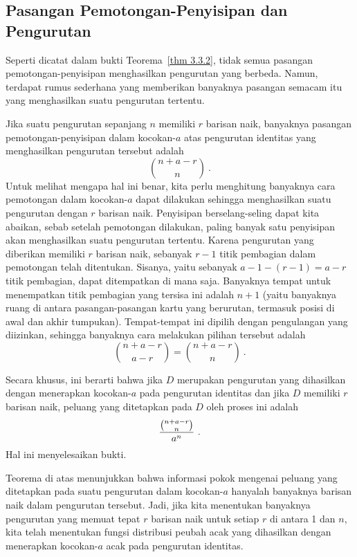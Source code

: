 \subsection*{Pasangan Pemotongan-Penyisipan dan Pengurutan}
Seperti dicatat dalam bukti Teorema~\ref{thm 3.3.2}, tidak semua pasangan
pemotongan-penyisipan menghasilkan pengurutan yang berbeda.  Namun, terdapat rumus
sederhana yang memberikan banyaknya pasangan semacam itu yang menghasilkan suatu
pengurutan tertentu.
\begin{theorem}\label{thm 3.3.3} Jika suatu pengurutan sepanjang $n$ memiliki $r$
barisan naik, banyaknya pasangan pemotongan-penyisipan dalam kocokan-$a$ atas pengurutan
identitas yang menghasilkan pengurutan tersebut adalah
$${{n + a - r}\choose{n}}\ .$$
\proof Untuk melihat mengapa hal ini benar, kita perlu menghitung banyaknya cara
pemotongan dalam kocokan-$a$ dapat dilakukan sehingga menghasilkan suatu pengurutan
dengan $r$ barisan naik.  Penyisipan berselang-seling dapat kita abaikan, sebab setelah
pemotongan dilakukan, paling banyak satu penyisipan akan menghasilkan suatu pengurutan
tertentu.  Karena pengurutan yang diberikan memiliki $r$ barisan naik, sebanyak $r-1$
titik pembagian dalam pemotongan telah ditentukan.  Sisanya, yaitu sebanyak $a - 1 -
(r - 1) = a - r$ titik pembagian, dapat ditempatkan di mana saja.  Banyaknya tempat untuk
menempatkan titik pembagian yang tersisa ini adalah $n+1$ (yaitu banyaknya ruang di antara
pasangan-pasangan kartu yang berurutan, termasuk posisi di awal dan akhir tumpukan).
Tempat-tempat ini dipilih dengan pengulangan yang diizinkan, sehingga banyaknya cara
melakukan pilihan tersebut adalah
$${{n + a - r}\choose{a-r}} = {{n + a - r}\choose{n}}\ .$$
\par Secara khusus, ini berarti bahwa jika $D$ merupakan pengurutan yang dihasilkan
dengan menerapkan kocokan-$a$ pada pengurutan identitas dan jika $D$ memiliki $r$ barisan
naik, peluang yang ditetapkan pada $D$ oleh proses ini adalah
$${{{{n + a - r}\choose{n}}}\over{a^n}}\ .$$ Hal ini menyelesaikan bukti.
\end{theorem}
\par
Teorema di atas menunjukkan bahwa informasi pokok mengenai peluang yang ditetapkan pada
suatu pengurutan dalam kocokan-$a$ hanyalah banyaknya barisan naik dalam pengurutan
tersebut.  Jadi, jika kita menentukan banyaknya pengurutan yang memuat tepat $r$ barisan
naik untuk setiap $r$ di antara 1 dan $n$, kita telah menentukan fungsi distribusi peubah
acak yang dihasilkan dengan menerapkan kocokan-$a$ acak pada pengurutan identitas.
